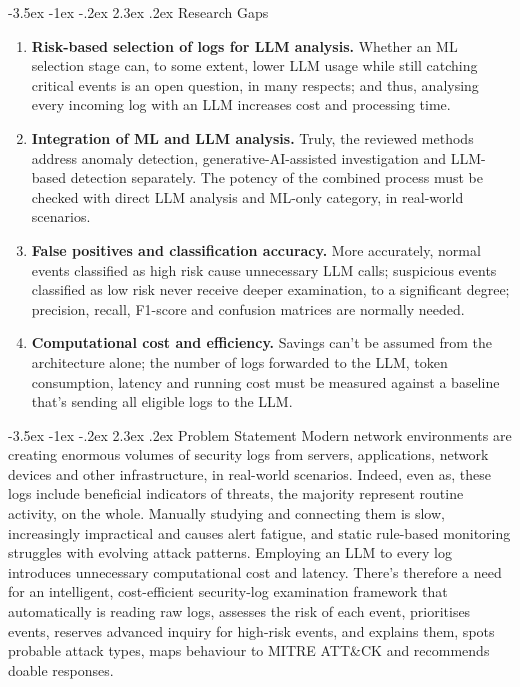 \documentclass[12pt,a4paper]{report}
\makeatletter
\renewcommand\section{\@startsection {section}{1}{\z@}%
  {-3.5ex \@plus -1ex \@minus -.2ex}%
  {2.3ex \@plus .2ex}%
  {\normalfont\fontsize{17}{21}\selectfont\bfseries}}
\makeatother
\begin{document}
\section{Research Gaps}
\begin{enumerate}[label=\arabic*.]
  \item \textbf{Risk-based selection of logs for LLM analysis.} Whether an ML selection stage can, to some extent, lower LLM usage while still catching critical events is an open question, in many respects; and thus, analysing every incoming log with an LLM increases cost and processing time.
  \item \textbf{Integration of ML and LLM analysis.} Truly, the reviewed methods address anomaly detection, generative-AI-assisted investigation and LLM-based detection separately. The potency of the combined process must be checked with direct LLM analysis and ML-only category, in real-world scenarios.
  \item \textbf{False positives and classification accuracy.} More accurately, normal events classified as high risk cause unnecessary LLM calls; suspicious events classified as low risk never receive deeper examination, to a significant degree; precision, recall, F1-score and confusion matrices are normally needed.
  \item \textbf{Computational cost and efficiency.} Savings can't be assumed from the architecture alone; the number of logs forwarded to the LLM, token consumption, latency and running cost must be measured against a baseline that's sending all eligible logs to the LLM.
\end{enumerate}

\section{Problem Statement}
Modern network environments are creating enormous volumes of security logs from servers, applications, network devices and other infrastructure, in real-world scenarios. Indeed, even as, these logs include beneficial indicators of threats, the majority represent routine activity, on the whole. Manually studying and connecting them is slow, increasingly impractical and causes alert fatigue, and static rule-based monitoring struggles with evolving attack patterns. Employing an LLM to every log introduces unnecessary computational cost and latency. There's therefore a need for an intelligent, cost-efficient security-log examination framework that automatically is reading raw logs, assesses the risk of each event, prioritises events, reserves advanced inquiry for high-risk events, and explains them, spots probable attack types, maps behaviour to MITRE ATT\&CK and recommends doable responses.
\end{document}
